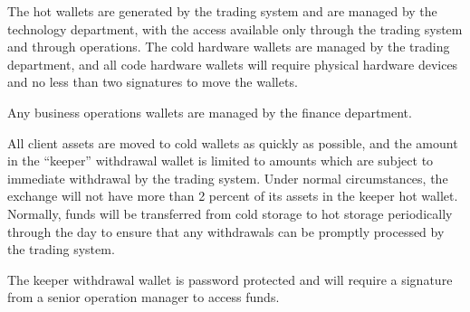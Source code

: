 The hot wallets are generated by the trading system and are managed by
the technology department, with the access available only through the
trading system and through operations.  The cold hardware wallets are
managed by the trading department, and all code hardware wallets will
require physical hardware devices and no less than two signatures to
move the wallets.

Any business operations wallets are managed by the finance
department.

All client assets are moved to cold wallets as quickly as possible,
and the amount in the ``keeper'' withdrawal wallet is limited to
amounts which are subject to immediate withdrawal by the trading
system.  Under normal circumstances, the exchange will not have more
than 2 percent of its assets in the keeper hot wallet.  Normally,
funds will be transferred from cold storage to hot storage periodically
through the day to ensure that any withdrawals can be
promptly processed by the trading system.

The keeper withdrawal wallet is password protected and will require a
signature from a senior operation manager to access funds.

